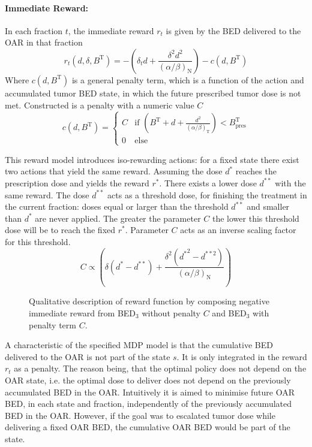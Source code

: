 \documentclass[\relativeRoot/ada.tex]{subfiles}
\begin{document}
\paragraph{Immediate Reward:} In each fraction $t$, the immediate reward $r_t$ is given by the BED delivered to the OAR in that fraction
\begin{equation*}
    r_t(d, \delta, B^{\text{T}}) = - \left( \delta_t d + \frac{\delta^2 d^2}{(\alpha / \beta)_\text{N}} \right) - c(d, B^{\text{T}})
\end{equation*}
Where $c(d, B^{\text{T}})$ is a general penalty term, which is a function of the action and accumulated tumor BED state, in which the future prescribed tumor dose is not met. Constructed is a penalty with a numeric value $C$
\begin{equation}\label{eq:penalty}
    c(d, B^{\text{T}}) =
    \begin{cases}
        C & \text{if } \left( B^{\text{T}} + d + \frac{d^2}{(\alpha / \beta)_\text{T}} \right)  < B_{\text{pres}}^{\text{T}}\\
        0 & \text{else}
    \end{cases}
\end{equation}

This reward model introduces iso-rewarding actions: for a fixed state there exist two actions that yield the same reward. Assuming the dose $d^{*}$ reaches the prescription dose and yields the reward $r^{*}$. There exists a lower dose $d^{**}$ with the same reward. The dose $d^{**}$ acts as a threshold dose, for finishing the treatment in the current fraction: doses equal or larger than the threshold $d^{**}$ and smaller than $d^{*}$ are never applied. The greater the parameter $C$ the lower this threshold dose will be to reach the fixed $r^{*}$. Parameter $C$ acts as an inverse scaling factor for this threshold.
\begin{equation*}
    C \propto \left( \delta (d^* - d^{**}) + \frac{\delta^2 \left( {d^*}^2 - d^{**2} \right)}{(\alpha / \beta)_\text{N}} \right)
\end{equation*}

\begin{figure}[!htb]
    
\caption{Qualitative description of reward function by composing negative immediate reward from BED$_{3}$ without penalty $C$ and BED$_{3}$ with penalty term $C$.}
\end{figure}

A characteristic of the specified MDP model is that the cumulative BED delivered to the OAR is not part of the state $s$. It is only integrated in the reward $r_t$ as a penalty. The reason being, that the optimal policy does not depend on the OAR state, i.e. the optimal dose to deliver does not depend on the previously accumulated BED in the OAR. Intuitively it is aimed to minimise future OAR BED, in each state and fraction, independently of the previously accumulated BED in the OAR. However, if the goal was to escalated tumor dose while delivering a fixed OAR BED, the cumulative OAR BED would be part of the state.
\end{document}
